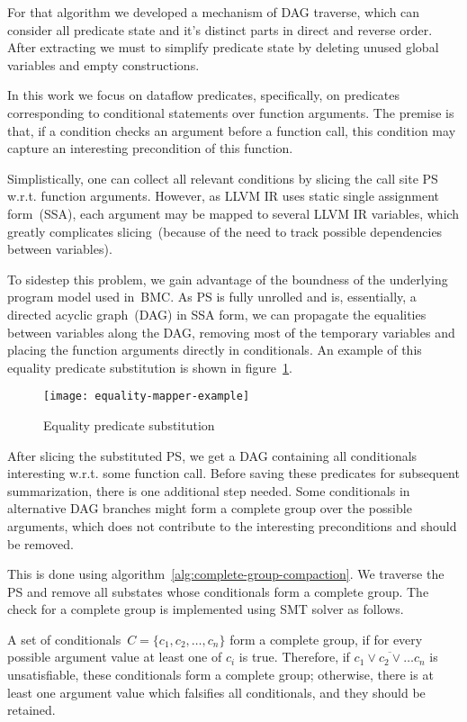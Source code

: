 For that algorithm we developed a mechanism of DAG traverse, which can consider all predicate state and it's distinct parts in direct and reverse order. After extracting we must to simplify predicate state by deleting unused global variables and empty constructions.


In this work we focus on dataflow predicates, specifically, on predicates corresponding to conditional statements over function arguments. The premise is that, if a condition checks an argument before a function call, this condition may capture an interesting precondition of this function.

Simplistically, one can collect all relevant conditions by slicing the call site PS w.r.t. function arguments. However, as LLVM IR uses static single assignment form~(SSA), each argument may be mapped to several LLVM IR variables, which greatly complicates slicing~(because of the need to track possible dependencies between variables).

To sidestep this problem, we gain advantage of the boundness of the underlying program model used in~BMC. As PS is fully unrolled and is, essentially, a directed acyclic graph~(DAG) in SSA form, we can propagate the equalities between variables along the DAG, removing most of the temporary variables and placing the function arguments directly in conditionals. An example of this equality predicate substitution is shown in figure~\ref{fig:equality-mapper-example}.

\begin{figure}[tbh]
\centering
\caption{Equality predicate substitution}
\label{fig:equality-mapper-example}
\texttt{[image: equality-mapper-example]}
\end{figure}

After slicing the substituted PS, we get a DAG containing all conditionals interesting w.r.t. some function call. Before saving these predicates for subsequent summarization, there is one additional step needed. Some conditionals in alternative DAG branches might form a complete group over the possible arguments, which does not contribute to the interesting preconditions and should be removed.

This is done using algorithm~\ref{alg:complete-group-compaction}. We traverse the PS and remove all substates whose conditionals form a complete group. The check for a complete group is implemented using SMT solver as follows.

A set of conditionals~$C = \{c_1, c_2, \ldots, c_n\}$ form a complete group, if for every possible argument value at least one of $c_i$ is true. Therefore, if $\overline{ c_1 \lor c_2 \lor \ldots c_n }$ is unsatisfiable, these conditionals form a complete group; otherwise, there is at least one argument value which falsifies all conditionals, and they should be retained.

